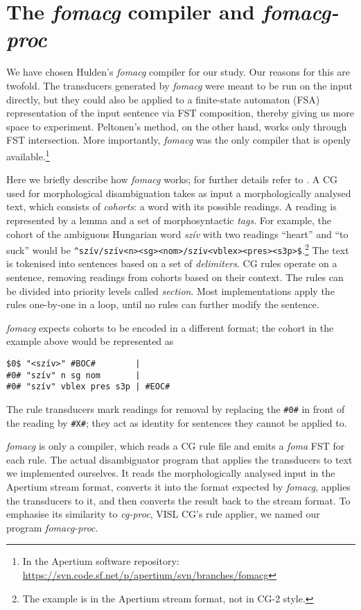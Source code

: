 \documentclass[11pt]{article}
\begin{document}
\section{The \emph{fomacg} compiler and \emph{fomacg-proc}}
\label{sec:fomacg}

We have chosen Hulden's \emph{fomacg} compiler for our study. Our
reasons for this are twofold. The transducers generated by \emph{fomacg} were
meant to be run on the input directly, but they could also be applied to a
finite-state automaton (FSA) representation of the input sentence via FST
composition, thereby giving us more space to experiment. Peltonen's method,
on the other hand, works only through FST intersection. More importantly,
\emph{fomacg} was the only compiler that is openly
available.\footnote{In the Apertium software repository:
\url{https://svn.code.sf.net/p/apertium/svn/branches/fomacg}}

Here we briefly describe how \emph{fomacg} works; for further details refer to
\cite{Hulden:2011}. A CG used for morphological disambiguation takes as input
a morphologically analysed text, which consists of \emph{cohorts}: a word with
its possible readings. A reading is
represented by a lemma and a set of morphosyntactic \emph{tags}. For example, the cohort of
the ambiguous Hungarian word \textit{szív} with two readings ``heart'' and
``to suck'' would be
\texttt{\^{}szív/szív<n><sg><nom>/szív<vblex><pres><s3p>\$}.\footnote{
The example is in the Apertium stream format, not in CG-2 style.} The text is
tokenised into sentences based on a set of \emph{delimiters}. CG rules
operate on a sentence, removing readings from cohorts based on their context.
The rules can be divided into priority levels called \emph{section}. Most
implementations apply the rules one-by-one in a loop, until no rules can further
modify the sentence.

\emph{fomacg} expects cohorts to be encoded in a different format; the cohort in
the example above would be represented as
\begin{verbatim}
$0$ "<szív>" #BOC#        |
#0# "szív" n sg nom       |
#0# "szív" vblex pres s3p | #EOC#
\end{verbatim}
The rule transducers mark readings for removal by replacing the \texttt{\#0\#}
in front of the reading by \texttt{\#X\#}; they act as identity for sentences
they cannot be applied to.

\emph{fomacg} is only a compiler, which reads a CG rule file and emits a
\emph{foma} FST for each rule. The actual disambiguator program that applies the
transducers to text we implemented ourselves. It reads the morphologically
analysed input in the Apertium stream format, converts it into the format
expected by \emph{fomacg}, applies the transducers to it, and then converts the
result back to the stream format. To emphasise its similarity to \emph{cg-proc},
VISL CG's rule applier, we named our program \emph{fomacg-proc}.
\end{document}
